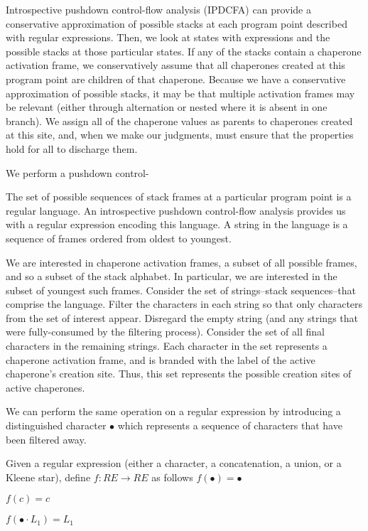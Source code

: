 \documentclass{sigplanconf}
\begin{document}
Introspective pushdown control-flow analysis (IPDCFA) can provide a conservative approximation of possible stacks at each program point described with regular expressions. Then, we look at states with expressions  and the possible stacks at those particular states. If any of the stacks contain a chaperone activation frame, we conservatively assume that all chaperones created at this program point are children of that chaperone. Because we have a conservative approximation of possible stacks, it may be that multiple activation frames may be relevant (either through alternation or nested where it is absent in one branch). We assign all of the chaperone values as parents to chaperones created at this site, and, when we make our judgments, must ensure that the properties hold for all to discharge them.

We perform a pushdown control-

The set of possible sequences of stack frames at a particular program point is a regular language.
An introspective pushdown control-flow analysis provides us with a regular expression encoding this language.
A string in the language is a sequence of frames ordered from oldest to youngest.

We are interested in chaperone activation frames, a subset of all possible frames, and so a subset of the stack alphabet.
In particular, we are interested in the subset of youngest such frames.
Consider the set of strings--stack sequences--that comprise the language.
Filter the characters in each string so that only characters from the set of interest appear.
Disregard the empty string (and any strings that were fully-consumed by the filtering process).
Consider the set of all final characters in the remaining strings.
Each character in the set represents a chaperone activation frame, and is branded with the label of the active chaperone's creation site.
Thus, this set represents the possible creation sites of active chaperones.

We can perform the same operation on a regular expression by introducing a distinguished character $\bullet$ which represents a sequence of characters that have been filtered away.

Given a regular expression (either a character, a concatenation, a union, or a Kleene star), define $f:RE \longrightarrow RE$ as follows
$f(\bullet)=\bullet$

$f(c)=c$

$f(\bullet\cdot L_1)=L_1$
\end{document}
